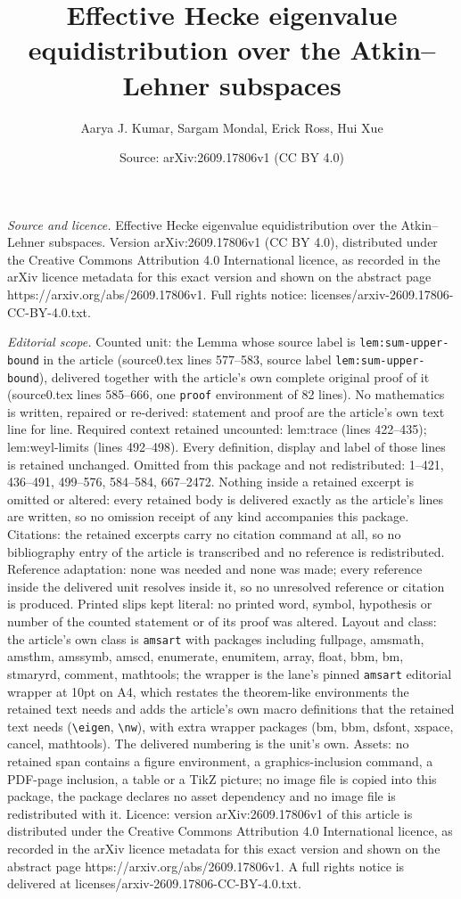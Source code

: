 \documentclass[10pt,a4paper]{amsart}
\title[Effective Hecke eigenvalue equidistribution over the Atkin--]{Effective Hecke eigenvalue equidistribution over the Atkin--Lehner subspaces}
\author{Aarya J. Kumar, Sargam Mondal, Erick Ross, Hui Xue}
\date{Source: arXiv:2609.17806v1 (CC BY 4.0)}
\begin{document}
\maketitle

\noindent\emph{Source and licence.} Effective Hecke eigenvalue equidistribution over the Atkin--Lehner subspaces. Version arXiv:2609.17806v1 (CC BY 4.0), distributed under the Creative Commons Attribution 4.0 International licence, as recorded in the arXiv licence metadata for this exact version and shown on the abstract page https://arxiv.org/abs/2609.17806v1. Full rights notice: licenses/arxiv-2609.17806-CC-BY-4.0.txt.\par\smallskip

\noindent\textit{Editorial scope.} Counted unit: the Lemma whose source label is \texttt{lem:sum-upper-bound} in the article (source0.tex lines 577--583, source label \texttt{lem:sum-upper-bound}), delivered together with the article's own complete original proof of it (source0.tex lines 585--666, one \texttt{proof} environment of 82 lines). No mathematics is written, repaired or re-derived: statement and proof are the article's own text line for line. Required context retained uncounted: lem:trace (lines 422--435); lem:weyl-limits (lines 492--498). Every definition, display and label of those lines is retained unchanged. Omitted from this package and not redistributed: 1--421, 436--491, 499--576, 584--584, 667--2472. Nothing inside a retained excerpt is omitted or altered: every retained body is delivered exactly as the article's lines are written, so no omission receipt of any kind accompanies this package. Citations: the retained excerpts carry no citation command at all, so no bibliography entry of the article is transcribed and no reference is redistributed. Reference adaptation: none was needed and none was made; every reference inside the delivered unit resolves inside it, so no unresolved reference or citation is produced. Printed slips kept literal: no printed word, symbol, hypothesis or number of the counted statement or of its proof was altered. Layout and class: the article's own class is \texttt{amsart} with packages including fullpage, amsmath, amsthm, amssymb, amscd, enumerate, enumitem, array, float, bbm, bm, stmaryrd, comment, mathtools; the wrapper is the lane's pinned \texttt{amsart} editorial wrapper at 10pt on A4, which restates the theorem-like environments the retained text needs and adds the article's own macro definitions that the retained text needs (\texttt{\textbackslash eigen}, \texttt{\textbackslash nw}), with extra wrapper packages (bm, bbm, dsfont, xspace, cancel, mathtools). The delivered numbering is the unit's own. Assets: no retained span contains a figure environment, a graphics-inclusion command, a PDF-page inclusion, a table or a TikZ picture; no image file is copied into this package, the package declares no asset dependency and no image file is redistributed with it. Licence: version arXiv:2609.17806v1 of this article is distributed under the Creative Commons Attribution 4.0 International licence, as recorded in the arXiv licence metadata for this exact version and shown on the abstract page https://arxiv.org/abs/2609.17806v1. A full rights notice is delivered at licenses/arxiv-2609.17806-CC-BY-4.0.txt. 
\end{document}
